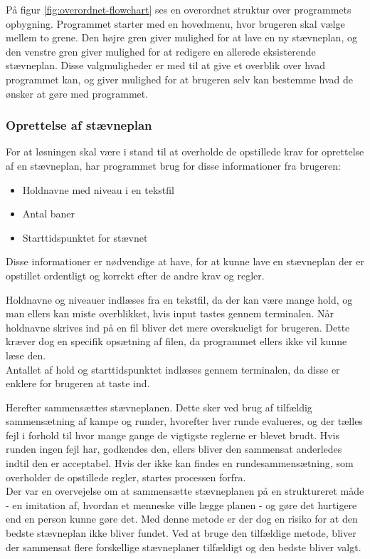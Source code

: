 På figur \ref{fig:overordnet-flowchart} ses en overordnet struktur over programmets opbygning. Programmet starter med en hovedmenu, hvor brugeren skal vælge mellem to grene. Den højre gren giver mulighed for at lave en ny stævneplan, og den venstre gren giver mulighed for at redigere en allerede eksisterende stævneplan. Disse valgmuligheder er med til at give et overblik over hvad programmet kan, og giver mulighed for at brugeren selv kan bestemme hvad de ønsker at gøre med programmet.

\subsubsection{Oprettelse af stævneplan}
For at løsningen skal være i stand til at overholde de opstillede krav for oprettelse af en stævneplan, har programmet brug for disse informationer fra brugeren:
\begin{itemize}
    \item Holdnavne med niveau i en tekstfil
    \item Antal baner
    \item Starttidspunktet for stævnet
\end{itemize}
Disse informationer er nødvendige at have, for at kunne lave en stævneplan der er opstillet ordentligt og korrekt efter de andre krav og regler. 
\par
Holdnavne og niveauer indlæses fra en tekstfil, da der kan være mange hold, og man ellers kan miste overblikket, hvis input tastes gennem terminalen. Når holdnavne skrives ind på en fil bliver det mere overskueligt for brugeren. Dette kræver dog en specifik opsætning af filen, da programmet ellers ikke vil kunne læse den.\\
Antallet af hold og starttidspunktet indlæses gennem terminalen, da disse er enklere for brugeren at taste ind.
\par
Herefter sammensættes stævneplanen. Dette sker ved brug af tilfældig sammensætning af kampe og runder, hvorefter hver runde evalueres, og der tælles fejl i forhold til hvor mange gange de vigtigste reglerne er blevet brudt. Hvis runden ingen fejl har, godkendes den, ellers bliver den sammensat anderledes indtil den er acceptabel. Hvis der ikke kan findes en rundesammensætning, som overholder de opstillede regler, startes processen forfra.\\
Der var en overvejelse om at sammensætte stævneplanen på en struktureret måde - en imitation af, hvordan et menneske ville lægge planen - og gøre det hurtigere end en person kunne gøre det. Med denne metode er der dog en risiko for at den bedste stævneplan ikke bliver fundet. Ved at bruge den tilfældige metode, bliver der sammensat flere forskellige stævneplaner tilfældigt og den bedste bliver valgt.\par
